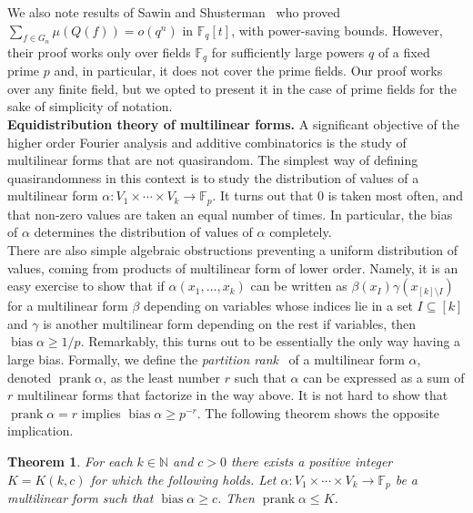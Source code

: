 \documentclass[a4paper,11pt]{article}
\newtheorem{theorem}{Theorem}
\theoremstyle{definition}
\newcommand{\on}[1]{
	\operatorname{#1}
}
\newcommand{\tdt}{\times\cdots\times}
\begin{document}
We also note results of Sawin and Shusterman~\cite{SawinShusterman} who proved $\sum_{f \in G_n} \mu(Q(f)) = o(q^n)$ in $\mathbb{F}_q[t]$, with power-saving bounds. However, their proof works only over fields $\mathbb{F}_q$ for sufficiently large powers $q$ of a fixed prime $p$ and, in particular, it does not cover the prime fields. Our proof works over any finite field, but we opted to present it in the case of prime fields for the sake of simplicity of notation.\\

\noindent\textbf{Equidistribution theory of multilinear forms.} A significant objective of the higher order Fourier analysis and additive combinatorics is the study of multilinear forms that are not quasirandom. The simplest way of defining quasirandomness in this context is to study the distribution of values of a multilinear form $\alpha : V_1 \tdt V_k \to \mathbb{F}_p$. It turns out that 0 is taken most often, and that non-zero values are taken an equal number of times. In particular, the bias of $\alpha$ determines the distribution of values of $\alpha$ completely. \\

There are also simple algebraic obstructions preventing a uniform distribution of values, coming from products of multilinear form of lower order. Namely, it is an easy exercise to show that if $\alpha(x_1, \dots, x_k)$ can be written as $\beta(x_I) \gamma(x_{[k] \setminus I})$ for a multilinear form $\beta$ depending on variables whose indices lie in a set $I\subseteq [k]$ and $\gamma$ is another multilinear form depending on the rest if variables, then $\on{bias} \alpha \geq 1/p$. Remarkably, this turns out to be essentially the only way having a large bias. Formally, we define the \textit{partition rank}~\cite{Naslund} of a multilinear form $\alpha$, denoted $\on{prank} \alpha$, as the least number $r$ such that $\alpha$ can be expressed as a sum of $r$ multilinear forms that factorize in the way above. It is not hard to show that $\on{prank} \alpha = r$ implies $\on{bias} \alpha \geq p^{-r}$. The following theorem shows the opposite implication.

\begin{theorem}\label{prankthm-intro}
    For each $k \in \mathbb{N}$ and $c > 0$ there exists a positive integer $K = K(k, c)$ for which the following holds. Let $\alpha : V_1\tdt V_k \to \mathbb{F}_p$ be a multilinear form such that $\on{bias} \alpha \geq c$. Then $\on{prank}\alpha \leq K$.
\end{theorem}
\end{document}
